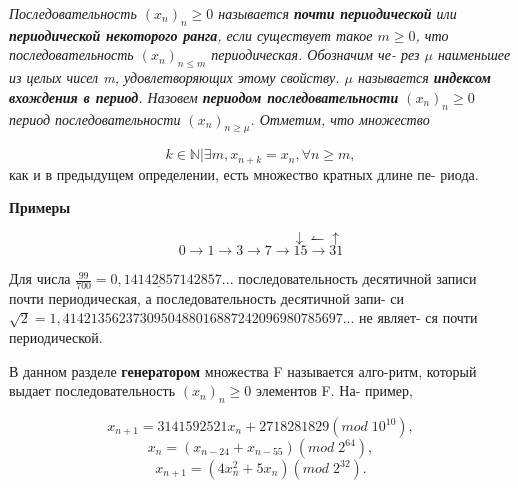 \documentclass{../template/mai_book}
\begin{document}
\begin{determ}
\slshape{Последовательность $(x_{n})_{n} \geqslant 0$} называется \textbf{почти периодической} \linebreak или \textbf{периодической некоторого ранга}, если существует такое \linebreak $m \geqslant 0$, что последовательность $(x_{n})_{n \leqslant m}$ периодическая. Обозначим че- \linebreak рез $\mu$ наименьшее из целых чисел m, удовлетворяющих этому свойству. \linebreak $\mu$ называется \textbf{индексом вхождения в период}. Назовем \textbf{периодом \linebreak последовательности} $(x_{n})_{n} \geqslant 0$ период последовательности $(x_{n})_{n \geqslant \mu}$. \linebreak Отметим, что множество \par 
{$${k \in \mathbb{N}|\exists m, x_{n+k} = x_{n}, \forall n \geqslant m},$$} \linebreak
как и в предыдущем определении, есть множество кратных длине пе- \linebreak риода.
\end{determ}
\textbf{Примеры} \par
{} \par 
$$\;\;\;\;\;\;\;\;\;\;\;\;\;\;\;\;\;\;\;\;\;\;\;\;\;\;\;\;\;\downarrow \leftharpoonup \uparrow$$
$$0 \to 1 \to 3 \to 7 \to 15 \to 31$$ \par 
Для числа $\frac{99}{700} = 0,14\underline{142857}142857...$ последовательность десятичной \linebreak записи почти периодическая, а последовательность десятичной запи- \linebreak си $\sqrt{2} = 1,4142135623730950488016887242096980785697...$ не являет- \linebreak ся почти периодической. \par 
В данном разделе \textbf{генератором} множества F называется алго-\linebreak ритм, который выдает последовательность $(x_{n})_{n}\geqslant 0$ элементов F. На- \linebreak пример, \par 
$$x_{n+1} = 3141592521 x_{n} + 2718281829 (mod \; 10^{10}),$$
$$x_{n} = (x_{n-24}+x_{n-55})(mod \; 2^{64}),$$
$$x_{n+1} = (4x_{n}^{2} + 5x_{n})(mod \; 2^{32}).$$ \par \newpage 
\end{document}
